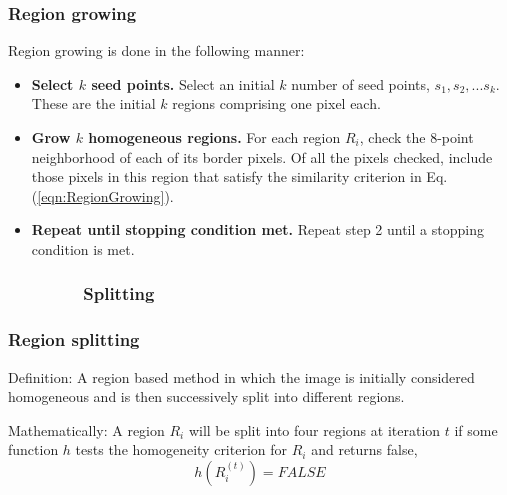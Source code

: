 \begin{frame}
\frametitle{Region growing}
\logoCSIPCPL\mypagenum
	Region growing is done in the following manner:
	\begin{itemize}
		\item \textbf{Select $k$ seed points.}  Select an initial $k$ number of seed points, $s_1, s_2, ... s_k$.  These are the initial $k$ regions comprising one pixel each.\\
		\item \textbf{Grow $k$ homogeneous regions.} For each region $R_i$, check the 8-point neighborhood of each of its border pixels.  Of all the pixels checked, include those pixels in this region that satisfy the similarity criterion in Eq. (\ref{eqn:RegionGrowing}).\\
		\item \textbf{Repeat until stopping condition met.} Repeat step 2 until a stopping condition is met.
	\end{itemize}
\end{frame}







\subsubsection{\ \ \ \ \ \ \ \ Splitting}
\begin{frame}
\frametitle{Region splitting}
\logoCSIPCPL\mypagenum
	\begin{block}{Definition:}
		A region based method in which the image is initially considered homogeneous and is then successively split into different regions.
	\end{block}	
	\begin{block}{Mathematically:}
		A region $R_i$ will be split into four regions at iteration $t$ if some function $h$ tests the homogeneity criterion for $R_i$ and returns false,
		\begin{equation}
			h(R_i^{(t)}) = FALSE \label{eqn:RegionSplitting}
		\end{equation}
	\end{block}
\end{frame}







